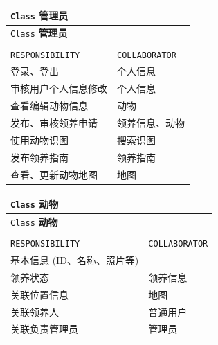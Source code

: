 \documentclass[12pt,a4paper,UTF8]{article}
\begin{document}
\begin{xltabular}{\linewidth}{|>{\raggedright\arraybackslash}p{8cm}|>{\raggedright\arraybackslash}p{4cm}|}
  \hline
  \verb|Class| \textbf{管理员} &  \\ \hline \endfirsthead
  \hline
  \verb|Class| \textbf{管理员} &  \\ \hline \endhead
  \hline
   \\ \endfoot
  \hline \endlastfoot

  \verb|RESPONSIBILITY| & \verb|COLLABORATOR| \\ \hline
  登录、登出 & 个人信息 \\ \hline
  审核用户个人信息修改 & 个人信息 \\ \hline
  查看编辑动物信息 & 动物 \\ \hline
  发布、审核领养申请 & 领养信息、动物 \\ \hline
  使用动物识图 & 搜索识图 \\ \hline
  发布领养指南 & 领养指南 \\ \hline
  查看、更新动物地图 & 地图 \\ \hline
\end{xltabular}

\vspace{1cm}

\begin{xltabular}{\linewidth}{|>{\raggedright\arraybackslash}p{8cm}|>{\raggedright\arraybackslash}p{4cm}|}
  \hline
  \verb|Class| \textbf{动物} &  \\ \hline \endfirsthead
  \hline
  \verb|Class| \textbf{动物} &  \\ \hline \endhead
  \hline
   \\ \endfoot
  \hline \endlastfoot

  \verb|RESPONSIBILITY| & \verb|COLLABORATOR| \\ \hline
  基本信息 (ID、名称、照片等) &  \\ \hline
  领养状态 & 领养信息 \\ \hline
  关联位置信息 & 地图 \\ \hline
  关联领养人 & 普通用户 \\ \hline
  关联负责管理员 & 管理员 \\ \hline
\end{xltabular}

\vspace{1cm}
\end{document}
